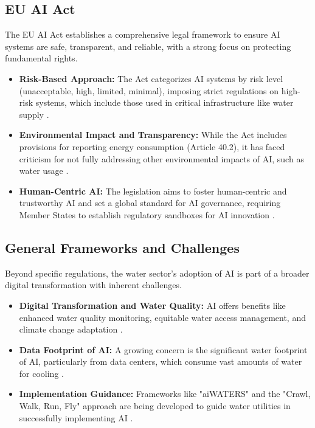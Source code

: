 \subsection{EU AI Act}
The EU AI Act establishes a comprehensive legal framework to ensure AI systems are safe, transparent, and reliable, with a strong focus on protecting fundamental rights.
\begin{itemize}
    \item \textbf{Risk-Based Approach:} The Act categorizes AI systems by risk level (unacceptable, high, limited, minimal), imposing strict regulations on high-risk systems, which include those used in critical infrastructure like water supply \cite{ArtificialIntelligenceAct_EU_AI_Act, Mondaq_EU_AI_Act}.
    \item \textbf{Environmental Impact and Transparency:} While the Act includes provisions for reporting energy consumption (Article 40.2), it has faced criticism for not fully addressing other environmental impacts of AI, such as water usage \cite{GreenSoftwareFoundation_EU_AI_Act, SmartWaterMagazine_EU_AI_Act}.
    \item \textbf{Human-Centric AI:} The legislation aims to foster human-centric and trustworthy AI and set a global standard for AI governance, requiring Member States to establish regulatory sandboxes for AI innovation \cite{Boell_EU_AI_Act}.
\end{itemize}

\subsection{General Frameworks and Challenges}
Beyond specific regulations, the water sector's adoption of AI is part of a broader digital transformation with inherent challenges.
\begin{itemize}
    \item \textbf{Digital Transformation and Water Quality:} AI offers benefits like enhanced water quality monitoring, equitable water access management, and climate change adaptation \cite{ResearchGate_General, FidoTech_General}.
    \item \textbf{Data Footprint of AI:} A growing concern is the significant water footprint of AI, particularly from data centers, which consume vast amounts of water for cooling \cite{Illinois_General}.
    \item \textbf{Implementation Guidance:} Frameworks like "aiWATERS" and the "Crawl, Walk, Run, Fly" approach are being developed to guide water utilities in successfully implementing AI \cite{WaterRF_General, YouTube_General}.\end{itemize}

